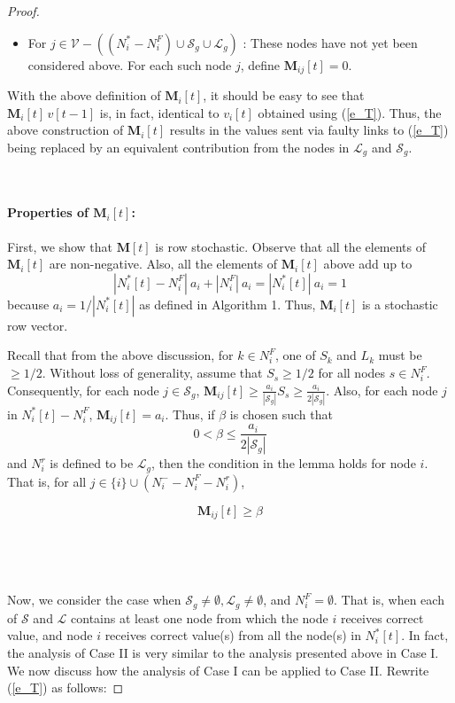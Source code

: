 \documentclass{llncs}
\newcommand{\scriptv}{\mathcal{V}}
\newcommand{\scriptl}{\mathcal{L}}
\newcommand{\scripts}{\mathcal{S}}
\newcommand{\matrixm}{\textbf{M}}
\begin{document}
\begin{proof}
\begin{itemize}
\item For $j\in \scriptv - ((N_i^* - N_i^F) \cup \scripts_g \cup \scriptl_g)$ :
These nodes have not yet been considered above.
For each such node $j$, define $\matrixm_{ij}[t] = 0$.
\end{itemize}
With the above definition of $\matrixm_i[t]$, it should be easy to see
that $\matrixm_i[t]\,v[t-1]$ is, in fact, identical to $v_i[t]$ obtained using (\ref{e_T}). Thus, the above construction of $\matrixm_i[t]$ results in the values sent via faulty links to (\ref{e_T}) being replaced by an equivalent contribution from the nodes in $\scriptl_g$ and $\scripts_g$.

~

\paragraph{Properties of $\matrixm_i[t]$:}


First, we show that $\matrixm[t]$ is row stochastic. Observe that all
the elements of $\matrixm_i[t]$ are non-negative.
Also, all the elements of $\matrixm_i[t]$ above add up to
\[
|N_i^*[t] - N_i^F|~a_i + |N_i^F|~a_i = |N_i^*[t]|~a_i = 1
\]
because $a_i = 1/|N_i^*[t]|$ as defined in Algorithm 1.
Thus, $\matrixm_i[t]$ is a stochastic row vector.

Recall that from the above discussion, for $k\in N_i^F$,
one of $S_k$ and $L_k$ must be $\geq 1/2$.
Without loss of generality, assume that $S_s \geq 1/2$ for all nodes $s \in N_i^F$.
Consequently, for each node $j \in \scripts_g$, $\matrixm_{ij}[t] \geq \frac{a_i}{|\scripts_g|} S_s \geq \frac{a_i}{2|\scripts_g|}$. Also,
for each node $j$ in $N_i^*[t] - N_i^F$,
$\matrixm_{ij}[t] = a_i$.
Thus, if $\beta$ is chosen such that
\begin{equation}
\label{eq:beta_caseI}
0 < \beta \leq \frac{a_i}{2|\scripts_g|}
\end{equation}
and $N_i^r$ is defined to be $\scriptl_g$, then the condition in the
lemma holds for node $i$. That is, 
for all $j \in \{i\}\cup(N_i^- - N_i^F - N_i^r)$, 

\[
\matrixm_{ij}[t] \geq \beta
\]




~



~

Now, we consider the case when $\scripts_g \neq \emptyset, \scriptl_g \neq \emptyset$, and $N_i^F = \emptyset$. That is, when each of $\scripts$ and $\scriptl$ contains at least one node from which the node $i$ receives correct value, and node $i$ receives correct value(s) from all the node(s) in $N_i^*[t]$. In fact, the analysis of Case II is very similar to the analysis presented above in Case I. We now discuss how the analysis of Case I can be applied to Case II. Rewrite (\ref{e_T}) as follows:


\end{proof}
\end{document}
